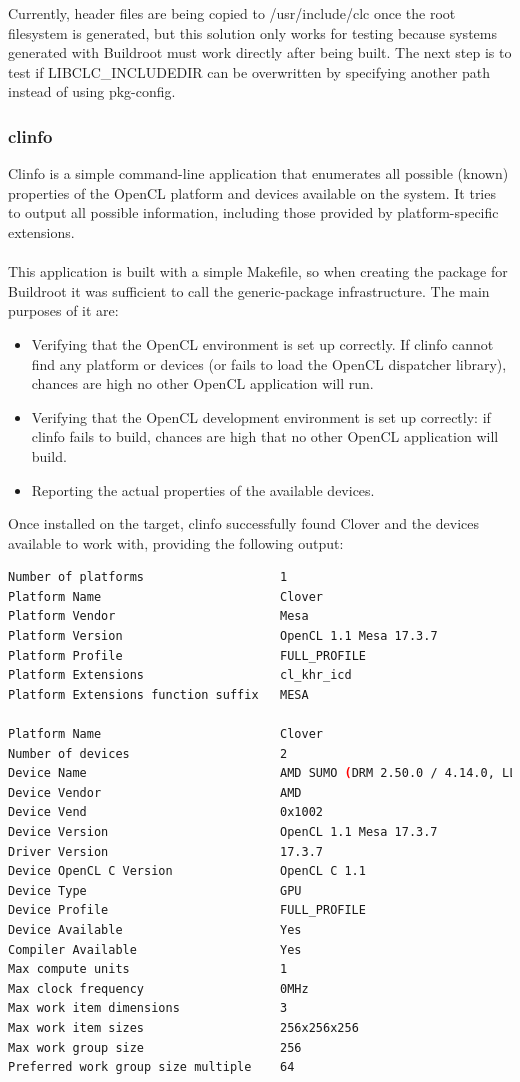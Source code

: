 \documentclass[12pt,a4paper,oneside]{article}
\begin{document}
Currently, header files are being copied to /usr/include/clc once the root
filesystem is generated, but this solution only works for testing because systems
generated with Buildroot must work directly after being built. The next step
is to test if LIBCLC\_INCLUDEDIR can be overwritten by specifying another path
instead of using pkg-config.

\subsubsection*{clinfo}
Clinfo is a simple command-line application that enumerates all possible (known)
properties of the OpenCL platform and devices available on the system. It tries
to output all possible information, including those provided by platform-specific
extensions.\\\\
This application is built with a simple Makefile, so when creating the package
for Buildroot it was sufficient to call the generic-package infrastructure. The
main purposes of it are:
\begin{itemize}
  \item Verifying that the OpenCL environment is set up correctly. If clinfo
  cannot find any platform or devices (or fails to load the OpenCL dispatcher
  library), chances are high no other OpenCL application will run.
  \item Verifying that the OpenCL development environment is set up correctly:
  if clinfo fails to build, chances are high that no other OpenCL application will
  build.
  \item Reporting the actual properties of the available devices.
\end{itemize}
Once installed on the target, clinfo successfully found Clover and the devices
available to work with, providing the following output:\\
\begin{lstlisting}[language=sh,caption={Output of clinfo},captionpos=b,keywords={}]
Number of platforms                   1
Platform Name                         Clover
Platform Vendor                       Mesa
Platform Version                      OpenCL 1.1 Mesa 17.3.7
Platform Profile                      FULL_PROFILE
Platform Extensions                   cl_khr_icd
Platform Extensions function suffix   MESA

Platform Name                         Clover
Number of devices                     2
Device Name                           AMD SUMO (DRM 2.50.0 / 4.14.0, LLVM 5.0.1)
Device Vendor                         AMD
Device Vend                           0x1002
Device Version                        OpenCL 1.1 Mesa 17.3.7
Driver Version                        17.3.7
Device OpenCL C Version               OpenCL C 1.1
Device Type                           GPU
Device Profile                        FULL_PROFILE
Device Available                      Yes
Compiler Available                    Yes
Max compute units                     1
Max clock frequency                   0MHz
Max work item dimensions              3
Max work item sizes                   256x256x256
Max work group size                   256
Preferred work group size multiple    64
\end{lstlisting}
\end{document}
